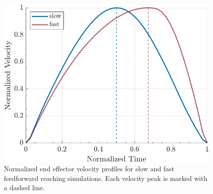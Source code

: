 \documentclass[letterpaper, 10pt, conference]{ieeeconf}
\begin{document}

\begin{figure}[h]
    \centering
    \includegraphics[width=1\linewidth]{images/single_slow_fast.jpg}
    \caption{Normalized end effector velocity profiles for slow and fast feedforward reaching simulations. Each velocity peak is marked with a dashed line.}
    \label{fig:VelocityFeedforward}
\end{figure}
\end{document}
